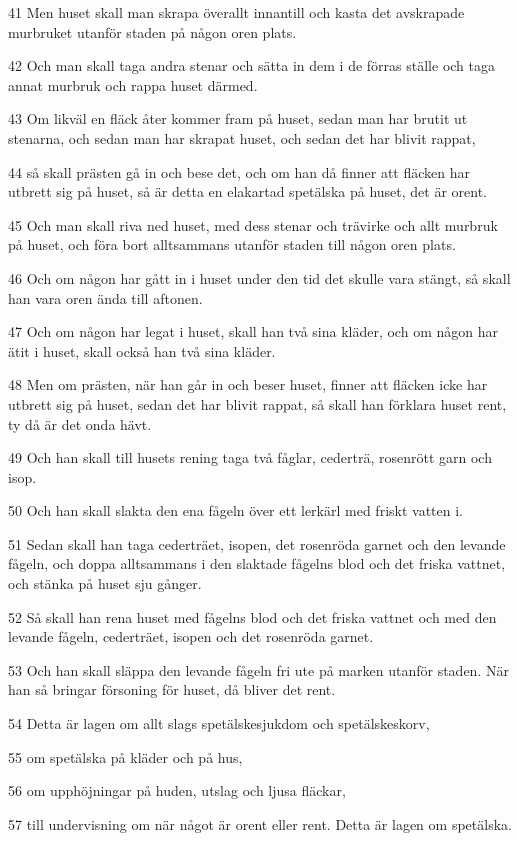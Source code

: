 \par 41 Men huset skall man skrapa överallt innantill och kasta det avskrapade murbruket utanför staden på någon oren plats.
\par 42 Och man skall taga andra stenar och sätta in dem i de förras ställe och taga annat murbruk och rappa huset därmed.
\par 43 Om likväl en fläck åter kommer fram på huset, sedan man har brutit ut stenarna, och sedan man har skrapat huset, och sedan det har blivit rappat,
\par 44 så skall prästen gå in och bese det, och om han då finner att fläcken har utbrett sig på huset, så är detta en elakartad spetälska på huset, det är orent.
\par 45 Och man skall riva ned huset, med dess stenar och trävirke och allt murbruk på huset, och föra bort alltsammans utanför staden till någon oren plats.
\par 46 Och om någon har gått in i huset under den tid det skulle vara stängt, så skall han vara oren ända till aftonen.
\par 47 Och om någon har legat i huset, skall han två sina kläder, och om någon har ätit i huset, skall också han två sina kläder.
\par 48 Men om prästen, när han går in och beser huset, finner att fläcken icke har utbrett sig på huset, sedan det har blivit rappat, så skall han förklara huset rent, ty då är det onda hävt.
\par 49 Och han skall till husets rening taga två fåglar, cederträ, rosenrött garn och isop.
\par 50 Och han skall slakta den ena fågeln över ett lerkärl med friskt vatten i.
\par 51 Sedan skall han taga cederträet, isopen, det rosenröda garnet och den levande fågeln, och doppa alltsammans i den slaktade fågelns blod och det friska vattnet, och stänka på huset sju gånger.
\par 52 Så skall han rena huset med fågelns blod och det friska vattnet och med den levande fågeln, cederträet, isopen och det rosenröda garnet.
\par 53 Och han skall släppa den levande fågeln fri ute på marken utanför staden. När han så bringar försoning för huset, då bliver det rent.
\par 54 Detta är lagen om allt slags spetälskesjukdom och spetälskeskorv,
\par 55 om spetälska på kläder och på hus,
\par 56 om upphöjningar på huden, utslag och ljusa fläckar,
\par 57 till undervisning om när något är orent eller rent. Detta är lagen om spetälska.

